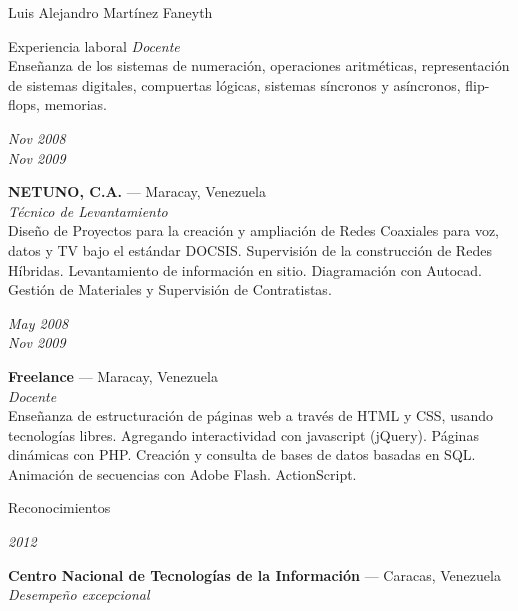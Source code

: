 \documentclass[11pt,letterpaper]{article}
\begin{document}
\begin{cv}{Luis Alejandro Mart\'inez Faneyth}
\begin{cvlist}{Experiencia laboral}
{{		\textit{Docente}\\
		\footnotesize{Ense\~nanza de los sistemas de numeraci\'on, operaciones aritm\'eticas, representaci\'on de sistemas digitales, compuertas l\'ogicas, sistemas s\'incronos y as\'incronos, flip-flops, memorias.}
	}
}
\item[{\parbox[t]{6em}{\textit{\large{Nov 2008\\Nov 2009}}}}]{
	\parbox[t]{\linewidth}{
		\textbf{NETUNO, C.A.} --- Maracay, Venezuela\\
		\textit{T\'ecnico de Levantamiento}\\
		\footnotesize{Dise\~no de Proyectos para la creaci\'on y ampliaci\'on de Redes Coaxiales para voz, datos y TV bajo el est\'andar DOCSIS. Supervisi\'on de la construcci\'on de Redes H\'ibridas. Levantamiento de informaci\'on en sitio. Diagramaci\'on con Autocad. Gesti\'on de Materiales y Supervisi\'on de Contratistas.}
	}
}
\item[{\parbox[t]{6em}{\textit{\large{May 2008\\Nov 2009}}}}]{
	\parbox[t]{\linewidth}{
		\textbf{Freelance} --- Maracay, Venezuela\\
		\textit{Docente}\\
		\footnotesize{Ense\~nanza de estructuraci\'on de p\'aginas web a trav\'es de HTML y CSS, usando tecnolog\'ias libres. Agregando interactividad con javascript (jQuery). P\'aginas din\'amicas con PHP. Creaci\'on y consulta de bases de datos basadas en SQL. Animaci\'on de secuencias con Adobe Flash. ActionScript.}
	}
}
\end{cvlist}

\begin{cvlist}{Reconocimientos}
\item[{\parbox[t]{6em}{\textit{\large{2012}}}}]{
	\parbox[t]{\linewidth}{
		\textbf{Centro Nacional de Tecnolog\'ias de la Informaci\'on} --- Caracas, Venezuela\\
		\textit{Desempe\~no excepcional}
	}
}
\end{cvlist}


\end{cv}
\end{document}
